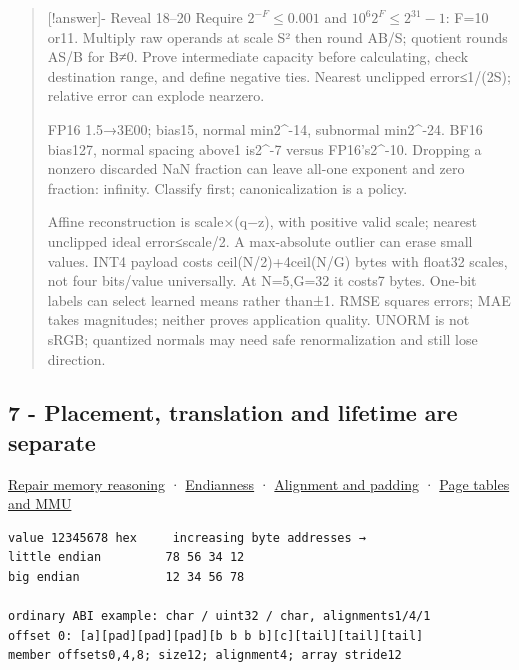 \begin{quote}
{[}!answer{]}- Reveal 18--20 Require \(2^{-F}\le0.001\) and \(10^6 2^F\le2^{31}-1\): F=10 or11. Multiply raw operands at scale S² then round AB/S; quotient rounds AS/B for B≠0. Prove intermediate capacity before calculating, check destination range, and define negative ties. Nearest unclipped error≤1/(2S); relative error can explode nearzero.

FP16 1.5→3E00; bias15, normal min2\^{}-14, subnormal min2\^{}-24. BF16 bias127, normal spacing above1 is2\^{}-7 versus FP16's2\^{}-10. Dropping a nonzero discarded NaN fraction can leave all-one exponent and zero fraction: infinity. Classify first; canonicalization is a policy.

Affine reconstruction is scale×(q−z), with positive valid scale; nearest unclipped ideal error≤scale/2. A max-absolute outlier can erase small values. INT4 payload costs ceil(N/2)+4ceil(N/G) bytes with float32 scales, not four bits/value universally. At N=5,G=32 it costs7 bytes. One-bit labels can select learned means rather than±1. RMSE squares errors; MAE takes magnitudes; neither proves application quality. UNORM is not sRGB; quantized normals may need safe renormalization and still lose direction.
\end{quote}

\subsection{7 - Placement, translation and lifetime are separate}\label{appendix-ef4d27797a92-placement-translation-and-lifetime-are-separate}

\hypertarget{appendix-ef4d27797a92-placement-translation-and-lifetime-are-separate}{}

\hyperref[01-foundations-i-ch002-where-the-bytes-live]{Repair memory reasoning} · \hyperref[appendix-bc07c3d25b18]{Endianness} · \hyperref[appendix-a1f7c53b4742]{Alignment and padding} · \hyperref[appendix-01e5905165c4]{Page tables and MMU}

\begin{verbatim}
value 12345678 hex     increasing byte addresses →
little endian         78 56 34 12
big endian            12 34 56 78

ordinary ABI example: char / uint32 / char, alignments1/4/1
offset 0: [a][pad][pad][pad][b b b b][c][tail][tail][tail]
member offsets0,4,8; size12; alignment4; array stride12
\end{verbatim}

